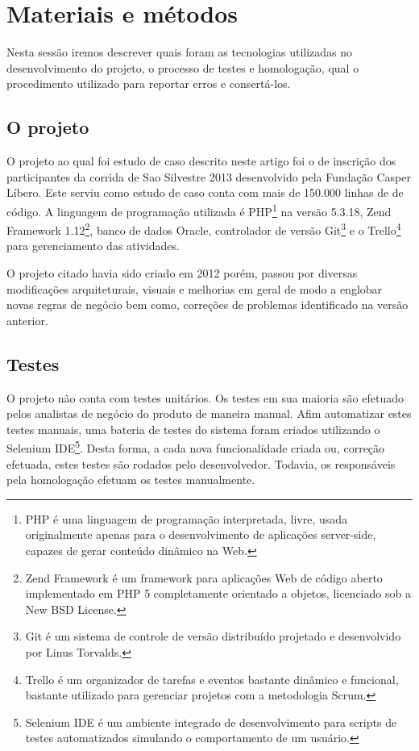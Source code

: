 \documentclass[11pt, a4paper]{article}
\begin{document}
\section{Materiais e métodos}
Nesta sessão iremos descrever quais foram as tecnologias utilizadas no desenvolvimento do projeto, o processo de testes e homologação, qual o procedimento utilizado para reportar erros e consertá-los.

\subsection{O projeto}
O projeto ao qual foi estudo de caso descrito neste artigo foi o de inscrição dos participantes da corrida de Sao Silvestre 2013 desenvolvido pela Fundação Casper Líbero. Este serviu como estudo de caso conta com mais de 150.000 linhas de de código. A linguagem de programação utilizada é PHP\footnote{PHP é uma linguagem de programação interpretada, livre, usada originalmente apenas para o desenvolvimento de aplicações server-side, capazes de gerar conteúdo dinâmico na Web.} na versão 5.3.18, Zend Framework 1.12\footnote{Zend Framework é um framework para aplicações Web de código aberto implementado em PHP 5 completamente orientado a objetos,  licenciado sob a New BSD License.}, banco de dados Oracle, controlador de versão Git\footnote{Git é um sistema de controle de versão distribuído projetado e desenvolvido por Linus Torvalds.} e o Trello\footnote{Trello é um organizador de tarefas e eventos bastante dinâmico e funcional, bastante utilizado para gerenciar projetos com a metodologia Scrum.} para gerenciamento das atividades.

O projeto citado havia sido criado em 2012 porém, passou por diversas modificações arquiteturais, visuais e melhorias em geral de modo a englobar novas regras de negócio bem como, correções de problemas identificado na versão anterior.

\subsection{Testes}
O projeto não conta com testes unitários. Os testes em sua maioria são efetuado pelos analistas de negócio do produto de maneira manual. Afim automatizar estes testes manuais, uma bateria de testes do sistema foram criados utilizando o Selenium IDE\footnote{Selenium IDE é um ambiente integrado de desenvolvimento para scripts de testes automatizados simulando o comportamento de um usuário.}. Desta forma, a cada nova funcionalidade criada ou, correção efetuada, estes testes são rodados pelo desenvolvedor. Todavia, os responsáveis pela homologação efetuam os testes manualmente.
\end{document}
